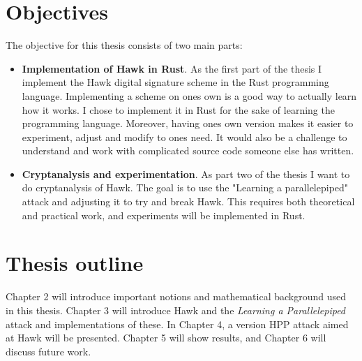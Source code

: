 \section{Objectives}
The objective for this thesis consists of two main parts:
\begin{itemize}
\item \textbf{Implementation of Hawk in Rust}. As the first part of the thesis I implement the Hawk digital signature scheme in the Rust programming language. 
    Implementing a scheme on ones own is a good way to actually learn how it works. I chose to implement it in Rust for the sake of learning the programming language.
    Moreover, having ones own version makes it easier to experiment, adjust and modify to ones need. It would also be a challenge to understand and work with complicated source code someone else has written.

\item \textbf{Cryptanalysis and experimentation}. As part two of the thesis I want to do cryptanalysis of Hawk. The goal is to use the "Learning a parallelepiped" attack \cite{hpp} and adjusting it to try and break Hawk. 
    This requires both theoretical and practical work, and experiments will be implemented in Rust.
\end{itemize}
\section{Thesis outline}
Chapter 2 will introduce important notions and mathematical background used in this thesis. Chapter 3 will introduce Hawk and the \textit{Learning a Parallelepiped} attack and implementations of these. 
In Chapter 4, a version HPP attack aimed at Hawk will be presented. Chapter 5 will show results, and Chapter 6 will discuss future work.
